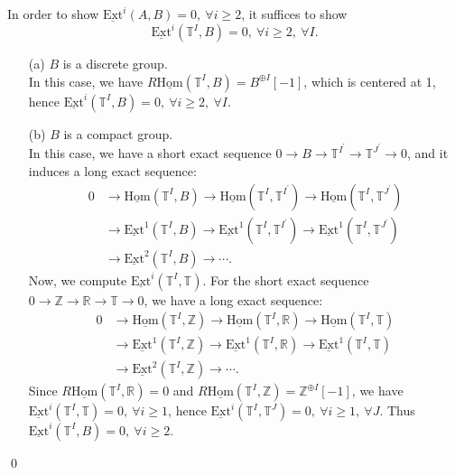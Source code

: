 \documentclass[UTF8,12,a4paper]{ctexart}
\theoremstyle{definition}
\begin{document}
\begin{itemize}
	In order to show $\underline{\text{Ext}}^i(A,B)=0,\ \forall i\geq 2$, it suffices to show 
	$$\underline{\text{Ext}}^i(\mathbb{T}^I,B)=0,\ \forall i\geq 2,\  \forall I.$$
	\begin{itemize}
		\item [(a)] $B$ is a discrete group.\\
		In this case, we have $R\underline{\text{Hom}}(\mathbb{T}^I,B)=B^{\oplus I}[-1]$, which is centered at 1, hence $\underline{\text{Ext}}^i(\mathbb{T}^I,B)=0,\ \forall i\geq 2,\  \forall I.$
		\item [(b)] $B$ is a compact group.\\
		In this case, we have a short exact sequence $0\rightarrow B\rightarrow \mathbb{T}^{I^\prime}\rightarrow \mathbb{T}^{J^\prime}\rightarrow 0$, and it induces a long exact sequence:
		\begin{align*}
		0&\longrightarrow \underline{\text{Hom}}(\mathbb{T}^I,B)\longrightarrow \underline{\text{Hom}}(\mathbb{T}^I,\mathbb{T}^{I^\prime})\longrightarrow \underline{\text{Hom}}(\mathbb{T}^I,\mathbb{T}^{J^\prime})\\
		&\longrightarrow \underline{\text{Ext}}^1(\mathbb{T}^I,B)\longrightarrow \underline{\text{Ext}}^1(\mathbb{T}^I,\mathbb{T}^{I^\prime})\longrightarrow \underline{\text{Ext}}^1(\mathbb{T}^I,\mathbb{T}^{J^\prime})\\
		&\longrightarrow \underline{\text{Ext}}^2(\mathbb{T}^I,B)\longrightarrow \cdots.
		\end{align*}
		 Now, we compute $\underline{\text{Ext}}^i(\mathbb{T}^I,\mathbb{T})$. For the short exact sequence $0\to \mathbb{Z}\to \mathbb{R}\to \mathbb{T}\to 0$, we have a long exact sequence:
		 \begin{align*}
		 0&\longrightarrow \underline{\text{Hom}}(\mathbb{T}^I,\mathbb{Z})\longrightarrow \underline{\text{Hom}}(\mathbb{T}^I,\mathbb{R})\longrightarrow \underline{\text{Hom}}(\mathbb{T}^I,\mathbb{T})\\
		 &\longrightarrow \underline{\text{Ext}}^1(\mathbb{T}^I,\mathbb{Z})\longrightarrow \underline{\text{Ext}}^1(\mathbb{T}^I,\mathbb{R})\longrightarrow \underline{\text{Ext}}^1(\mathbb{T}^I,\mathbb{T})\\
		 &\longrightarrow \underline{\text{Ext}}^2(\mathbb{T}^I,\mathbb{Z})\longrightarrow \cdots.
		 \end{align*}
		 Since $R\underline{\text{Hom}}(\mathbb{T}^I,\mathbb{R})=0$ and $R\underline{\text{Hom}}(\mathbb{T}^I,\mathbb{Z})=\mathbb{Z}^{\oplus I}[-1]$, we have $\underline{\text{Ext}}^i(\mathbb{T}^I,\mathbb{T})=0,\ \forall i\geq 1$, hence $\underline{\text{Ext}}^i(\mathbb{T}^I,\mathbb{T}^J)=0,\ \forall i\geq 1,\ \forall J$. Thus $\underline{\text{Ext}}^i(\mathbb{T}^I,B)=0,\ \forall i\geq 2.$
	\end{itemize}
\end{itemize}
\qed
\end{document}
